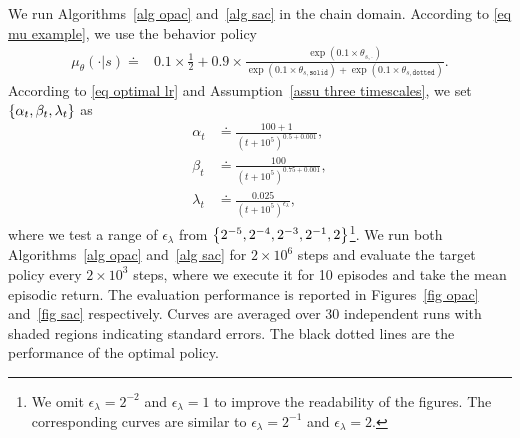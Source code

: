 \documentclass[twoside,11pt]{article}
\numberwithin{assucounter}{section}
\begin{document}
We run Algorithms~\ref{alg opac} and~\ref{alg sac} in the chain domain.
According to \eqref{eq mu example},
we use the behavior policy
\begin{align}
  \mu_\theta(\cdot|s) \doteq& 0.1 \times \frac{1}{2} + 0.9 \times \frac{\exp(0.1 \times \theta_{s,\cdot})}{\exp(0.1 \times \theta_{s,\texttt{solid}}) + \exp(0.1 \times \theta_{s,\texttt{dotted}})}.
\end{align}
According to \eqref{eq optimal lr} and Assumption~\ref{assu three timescales},
we set $\qty{\alpha_t, \beta_t, \lambda_t}$ as
\begin{align}
  \alpha_t &\doteq \frac{100 + 1}{(t + 10^5)^{0.5+0.001}}, \\
  \beta_t &\doteq \frac{100}{(t+10^5)^{0.75 + 0.001}}, \\
  \lambda_t &\doteq \frac{0.025}{(t + 10^5)^{\epsilon_\lambda}},
\end{align}
where we test a range of $\epsilon_\lambda$ from $\qty{2^{-5}, 2^{-4}, 2^{-3}, 2^{-1}, 2}$\footnote{We omit $\epsilon_\lambda = 2^{-2}$ and $\epsilon_\lambda = 1$ to improve the readability of the figures. 
The corresponding curves are similar to $\epsilon_\lambda = 2^{-1}$ and $\epsilon_\lambda = 2$.}.
We run both Algorithms~\ref{alg opac} and~\ref{alg sac} for $2\times 10^6$ steps 
and evaluate the target policy every $2 \times 10^3$ steps,
where 
we execute it for 10 episodes and take the mean episodic return.
The evaluation performance is reported in Figures~\ref{fig opac} and~\ref{fig sac} respectively.
Curves are averaged over 30 independent runs with shaded regions indicating standard errors.
The black dotted lines are the performance of the optimal policy.
\end{document}
